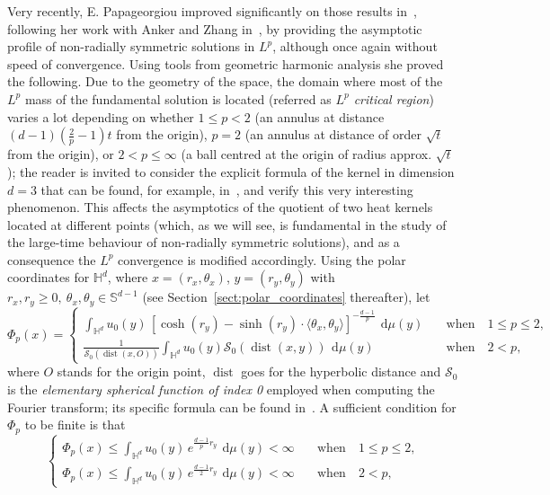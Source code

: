 \documentclass[12pt,longbibliography]{article}
\def\S{\mathbb{S}}
\def\d{\,\mathrm{d}}
\DeclareMathOperator{\dist}{dist}
\def\d{\,\mathrm{d}}
\def\H{\mathbb{H}}
\theoremstyle{definition}
\theoremstyle{remark}
\theoremstyle{example}
\begin{document}
Very recently, E. Papageorgiou improved significantly on those results in~\cite{Papageorgiou2025}, following her work with Anker and Zhang in~\cite{APZ}, by providing the asymptotic profile of non-radially symmetric solutions in $L^p$, although once again without speed of convergence. Using tools from geometric harmonic analysis she proved the following. Due to the geometry of the space, the domain where most of the $L^p$ mass of the fundamental solution is located (referred as \textit{$L^p$ critical region}) varies a lot depending on whether $1\leq p<2$ (an annulus at distance $(d-1)(\frac{2}{p}-1)t$ from the origin), $p=2$ (an annulus at distance of order $\sqrt{t}$ from the origin), or $2<p\leq \infty$ (a ball centred at the origin of radius approx. $\sqrt{t}$); the reader is invited to consider the explicit formula of the kernel in dimension $d=3$ that can be found, for example, in~\cite{grigoryan1998heat}, and verify this very interesting phenomenon. This affects the asymptotics of the quotient of two heat kernels located at different points (which, as we will see, is fundamental in the study of the large-time behaviour of non-radially symmetric solutions), and as a consequence the $L^p$ convergence is modified accordingly. Using the polar coordinates for $\H^d$, where $x=(r_x, \theta_x)$, $y=(r_y, \theta_y)$ with $r_x, r_y\geq 0,\ \theta_x, \theta_y\in \S^{d-1}$ (see Section~\ref{sect:polar_coordinates} thereafter), let
\begin{equation}\label{eq:Phi_p_papagoergiou}
	\Phi_p(x) = \begin{cases}\displaystyle\int_{\H^d} u_0(y)\, \left[ \cosh (r_y)-\sinh (r_y) \cdot \langle\theta_x,\theta_y\rangle \right]^{-\frac{d-1}{p}}\ \d\mu(y)\quad&\text{when}\quad 1\leq p\leq 2,\\[20pt]
\displaystyle\frac{1}{\mathcal{S}_0(\dist(x,O))}\int_{\H^d} u_0(y) \mathcal{S}_0(\dist(x,y))\ \d\mu(y)&\text{when}\quad 2 < p,
\end{cases}
\end{equation}
where $O$ stands for the origin point, $\dist$ goes for the hyperbolic distance and $\mathcal{S}_0$ is the \textit{elementary spherical function of index 0} employed when computing the Fourier transform; its specific formula can be found in~\cite[Appendix]{Papageorgiou2025}. A sufficient condition for $\Phi_p$ to be finite is that
\begin{equation}\label{eq:condition_papgeorgiiou}
\begin{cases}\Phi_p(x)\leq \displaystyle\int_{\H^d} u_0(y)\, e^{\frac{d-1}{p}r_y}\ \d\mu(y)<\infty\quad&\text{when}\quad 1\leq p\leq 2,\\[20pt]
	\Phi_p(x)\leq \displaystyle\int_{\H^d} u_0(y)\, e^{\frac{d-1}{2}r_y}\ \d\mu(y)<\infty&\text{when}\quad 2 < p,
\end{cases}
\end{equation}
\end{document}
